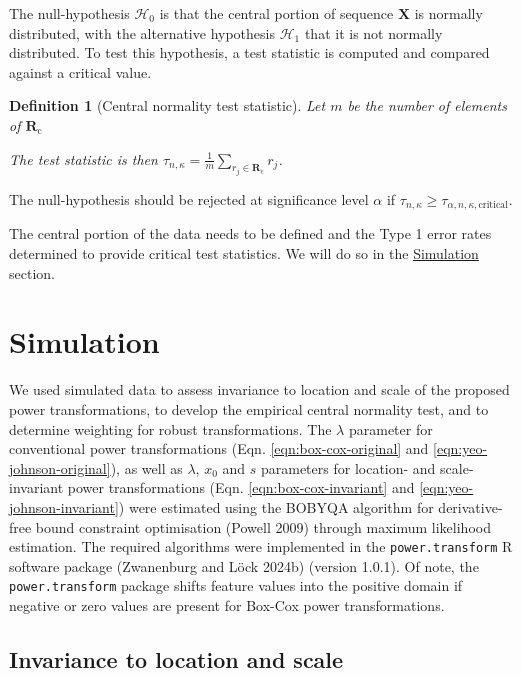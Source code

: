 \documentclass[
  a4paper,
]{article}
\newtheorem*{definition}{Definition}
\begin{document}
The null-hypothesis \(\mathcal{H}_0\) is that the central portion of
sequence \(\mathbf{X}\) is normally distributed, with the alternative
hypothesis \(\mathcal{H}_1\) that it is not normally distributed. To
test this hypothesis, a test statistic is computed and compared against
a critical value.

\begin{definition}[Central normality test statistic]
Let $m$ be the number of elements of $\mathbf{R}_{\text{c}}$

The test statistic is then $\tau_{n, \kappa} = \frac{1}{m}\sum_{r_j \in \mathbf{R}_{\text{c}}}r_j$.

\end{definition}

The null-hypothesis should be rejected at significance level \(\alpha\)
if \(\tau_{n, \kappa} \geq \tau_{\alpha, n, \kappa, \text{critical}}\).

The central portion of the data needs to be defined and the Type 1 error
rates determined to provide critical test statistics. We will do so in
the \hyperref[simulation]{Simulation} section.

\section{Simulation}\label{simulation}

We used simulated data to assess invariance to location and scale of the
proposed power transformations, to develop the empirical central
normality test, and to determine weighting for robust transformations.
The \(\lambda\) parameter for conventional power transformations (Eqn.
\ref{eqn:box-cox-original} and \ref{eqn:yeo-johnson-original}), as well
as \(\lambda\), \(x_0\) and \(s\) parameters for location- and
scale-invariant power transformations (Eqn. \ref{eqn:box-cox-invariant}
and \ref{eqn:yeo-johnson-invariant}) were estimated using the BOBYQA
algorithm for derivative-free bound constraint optimisation (Powell
2009) through maximum likelihood estimation. The required algorithms
were implemented in the \texttt{power.transform} R software package
(Zwanenburg and Löck 2024b) (version 1.0.1). Of note, the
\texttt{power.transform} package shifts feature values into the positive
domain if negative or zero values are present for Box-Cox power
transformations.

\subsection{Invariance to location and
scale}\label{invariance-to-location-and-scale}
\end{document}
